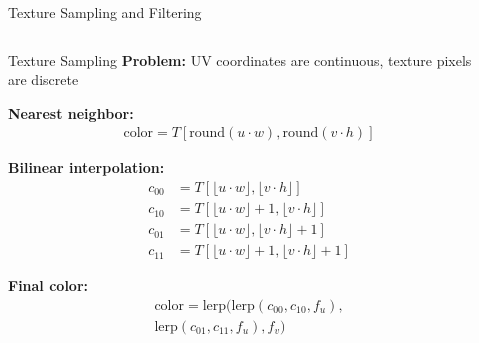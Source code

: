 \begin{frame}{Texture Sampling and Filtering}
  \begin{columns}
    \begin{column}{0.6\textwidth}
      \begin{mathbox}{Texture Sampling}
        \footnotesize
        \textbf{Problem:} UV coordinates are continuous, texture pixels are discrete

        \vspace{0.2cm}
        \textbf{Nearest neighbor:}
        \begin{align*}
          \text{color} = T[\text{round}(u \cdot w), \text{round}(v \cdot h)]
        \end{align*}

        \vspace{0.2cm}
        \textbf{Bilinear interpolation:}
        \begin{align*}
          c_{00} &= T[\lfloor u \cdot w \rfloor, \lfloor v \cdot h \rfloor] \\
          c_{10} &= T[\lfloor u \cdot w \rfloor + 1, \lfloor v \cdot h \rfloor] \\
          c_{01} &= T[\lfloor u \cdot w \rfloor, \lfloor v \cdot h \rfloor + 1] \\
          c_{11} &= T[\lfloor u \cdot w \rfloor + 1, \lfloor v \cdot h \rfloor + 1]
        \end{align*}

        \vspace{0.2cm}
        \textbf{Final color:}
        \begin{align*}
          \text{color} = \text{lerp}(\text{lerp}(c_{00}, c_{10}, f_u), \\
          \text{lerp}(c_{01}, c_{11}, f_u), f_v)
        \end{align*}
      \end{mathbox}
    \end{column}
    \begin{column}{0.4\textwidth}

      \begin{center}
\end{center}
\end{column}
\end{columns}
\end{frame}
